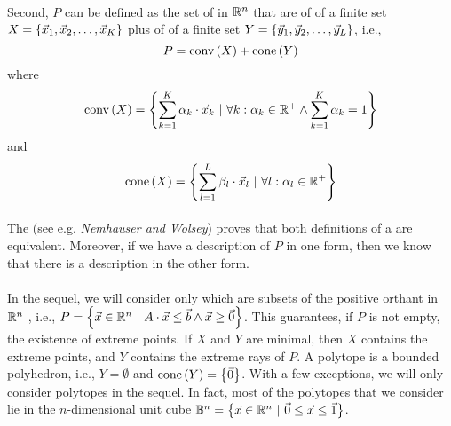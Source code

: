 \paragraph{}
Second, $P$ can be defined as the set of  in $\RRR^n$ that are  of  of a finite set $X=\accl{\vec{x}_1,\vec{x}_2,\ldots,\vec{x}_K}$ plus  of  of a finite set $Y=\accl{\vec{y}_1,\vec{y}_2,\ldots,\vec{y}_L}$, i.e.,
\begin{equation}
P=\funm{conv}{X}+\funm{cone}{Y}
\end{equation}
where
\begin{equation}
\funm{conv}{X}=\condset{\sumieqb[k]{1}{K}{\alpha_k\cdot\vec{x}_k}}{\forall k:\alpha_k\in\RRR^+\wedge\sumieqb[k]{1}{K}{\alpha_k}=1}
\end{equation}
and
\begin{equation}
\funm{cone}{X}=\condset{\sumieqb[l]{1}{L}{\beta_l\cdot\vec{x}_l}}{\forall l:\alpha_l\in\RRR^+}
\end{equation}

\paragraph{}
The  (see e.g. \emph{Nemhauser and Wolsey}\cite{citeulike:2212037}) proves that both definitions of a  are equivalent. Moreover, if we have a description of $P$ in one form, then we know that there is a description in the other form.

\paragraph{}
In the sequel, we will consider only  which are subsets of the positive orthant in $\RRR^n$ , i.e., $P=\condset{\vec{x}\in\RRR^n}{A\cdot\vec{x}\leq\vec{b}\wedge\vec{x}\geq\vec{0}}$. This guarantees, if $P$ is not empty, the existence of extreme points. If $X$ and $Y$ are minimal, then $X$ contains the extreme points, and $Y$ contains the extreme rays of $P$. A polytope is a bounded polyhedron, i.e., $Y=\emptyset$ and $\funm{cone}{Y}=\accl{\vec{0}}$. With a few exceptions, we will only consider polytopes in the sequel. In fact, most of the polytopes that we consider lie in the $n$-dimensional unit cube $\BBB^n=\condset{\vec{x}\in\RRR^n}{\vec{0}\leq\vec{x}\leq\vec{1}}$.

